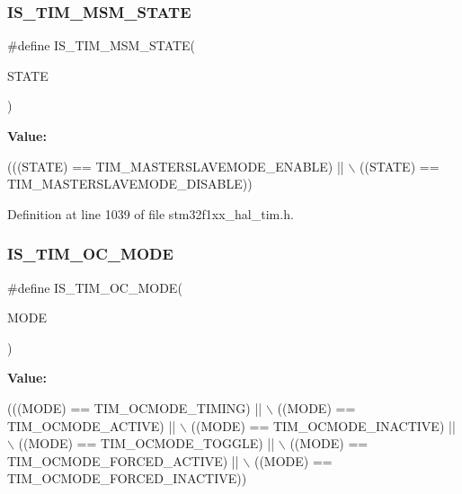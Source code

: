 \subsubsection{\texorpdfstring{I\+S\+\_\+\+T\+I\+M\+\_\+\+M\+S\+M\+\_\+\+S\+T\+A\+TE}{IS\_TIM\_MSM\_STATE}}
{\footnotesize\ttfamily \#define I\+S\+\_\+\+T\+I\+M\+\_\+\+M\+S\+M\+\_\+\+S\+T\+A\+TE(\begin{DoxyParamCaption}\item[{}]{S\+T\+A\+TE }\end{DoxyParamCaption})}

{\bfseries Value\+:}
\begin{DoxyCode}
(((STATE) == TIM\_MASTERSLAVEMODE\_ENABLE) || \(\backslash\)
                                 ((STATE) == TIM\_MASTERSLAVEMODE\_DISABLE))
\end{DoxyCode}


Definition at line 1039 of file stm32f1xx\+\_\+hal\+\_\+tim.\+h.

\mbox{\label{group___t_i_m___private___macros_ga93d898976e236c135bfd02a0c213c8ec}} 
\subsubsection{\texorpdfstring{I\+S\+\_\+\+T\+I\+M\+\_\+\+O\+C\+\_\+\+M\+O\+DE}{IS\_TIM\_OC\_MODE}}
{\footnotesize\ttfamily \#define I\+S\+\_\+\+T\+I\+M\+\_\+\+O\+C\+\_\+\+M\+O\+DE(\begin{DoxyParamCaption}\item[{}]{M\+O\+DE }\end{DoxyParamCaption})}

{\bfseries Value\+:}
\begin{DoxyCode}
(((MODE) == TIM\_OCMODE\_TIMING)       || \(\backslash\)
                          ((MODE) == TIM\_OCMODE\_ACTIVE)           || \(\backslash\)
                          ((MODE) == TIM\_OCMODE\_INACTIVE)         || \(\backslash\)
                          ((MODE) == TIM\_OCMODE\_TOGGLE)           || \(\backslash\)
                          ((MODE) == TIM\_OCMODE\_FORCED\_ACTIVE)    || \(\backslash\)
                          ((MODE) == TIM\_OCMODE\_FORCED\_INACTIVE))
\end{DoxyCode}



